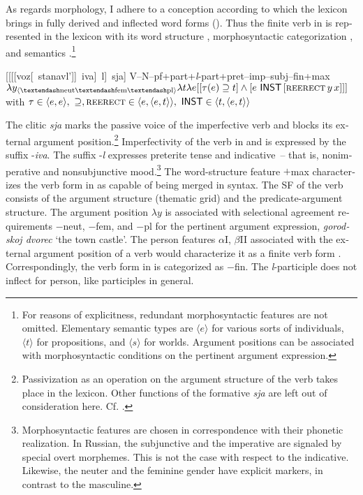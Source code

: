 \documentclass[output=paper,colorlinks,citecolor=brown]{langscibook}
\begin{document}
\begin{otherlanguage}{english}
As regards morphology, I adhere to a conception according to which the lexicon brings in fully derived and inflected word forms (\citealt{Wunderlich1997}). Thus the finite verb in  is represented in the lexicon with its word structure , morphosyntactic categorization , and semantics .\footnote{For reasons of explicitness, redundant morphosyntactic features are not omitted. Elementary semantic types are $\langle e \rangle$ for various sorts of individuals, $\langle t \rangle$ for propositions, and $\langle s \rangle$ for worlds. Argument positions can be associated with morphosyntactic conditions on the pertinent argument expression.
}

\begin{exe}
\ex	\label{ex:16:4}
\begin{xlist}
	\ex	\mbox{[[[[voz[ stanavl']] iva] l] sja]} \label{wordstructure} 
	\ex	{+}V--N--pf+part+\textit{l}-part+pret--imp--subj--fin+max \label{morphosyntax}
	\ex	$\lambda y_{\langle–\text{neut}–\text{fem}–\text{pl}\rangle} \lambda t \lambda e [[\tau(e) \supseteq t ] \wedge [e\,\,\cnst{inst}\, [\textsc{reerect}\, y\, x]]]$ \newline
		with $\tau \in \langle e, e\rangle, \, \, \supseteq, \textsc{reerect} \in \langle e, \langle e,t\rangle\rangle, \, \, \cnst{inst} \in \langle t, \langle e,t \rangle \rangle$     \label{semantics}
\end{xlist}
\end{exe}

\noindent The clitic \textit{sja} marks the passive voice of the imperfective verb and blocks its external argument position.\footnote{Passivization as an operation on the argument structure of the verb takes place in the lexicon. Other functions of the formative \textit{sja} are left out of consideration here. Cf. \textcite{Fehrmann-Junghanns-etal2010}.
} Imperfectivity of the verb in  and  is expressed by the suffix -\textit{iva}. The suffix -\textit{l} expresses preterite tense and \mbox{indicative --} that is, nonimperative and nonsubjunctive mood.\footnote{Morphosyntactic features are chosen in correspondence with their phonetic realization. In Russian, the subjunctive and the imperative are signaled by special overt morphemes. This is not the case with respect to the indicative. Likewise, the neuter and the feminine gender have explicit markers, in contrast to the masculine.
} The word-structure feature $+$max characterizes the verb form in  as capable of being merged in syntax. The SF of the verb consists of the argument structure (thematic grid) and the predicate-argument structure. The argument position $\lambda y$ is associated with selectional agreement requirements $-$neut, $-$fem, and $-$pl for the pertinent argument expression, \textit{gorodskoj dvorec} `the town castle'. The person features $\alpha$I, $\beta$II associated with the external argument position of a verb would characterize it as a finite verb form \citep[129]{Pitsch2014}. Correspondingly, the verb form in  is categorized as $-$fin. The \textit{l}-participle does not inflect for person, like participles in general.


\end{otherlanguage}
\end{document}
